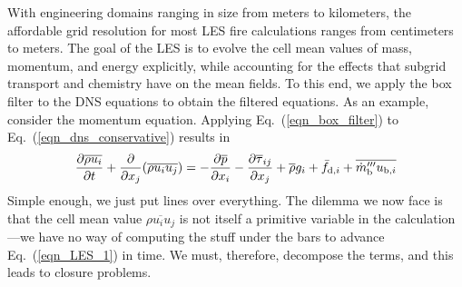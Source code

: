 With engineering domains ranging in size from meters to kilometers, the affordable grid resolution for most LES fire calculations ranges from centimeters to meters.  The goal of the LES is to evolve the cell mean values of mass, momentum, and energy explicitly, while accounting for the effects that subgrid transport and chemistry have on the mean fields.  To this end, we apply the box filter to the DNS equations to obtain the filtered equations.  As an example, consider the momentum equation.  Applying Eq.~(\ref{eqn_box_filter}) to Eq.~(\ref{eqn_dns_conservative}) results in
\begin{equation}
\label{eqn_LES_1}
\frac{\partial \overline{\rho u_i}}{\partial t} + \frac{\partial}{\partial x_j} (\overline{\rho u_i u_j}) = -\frac{\partial \overline{p}}{\partial x_i} - \frac{\partial \overline{\tau}_{ij}}{\partial x_j} + \overline{\rho} g_i + \bar{f}_{{\rm d},i} + \overline{\dot{m}_{\rm b}^{\prime\prime\prime} u_{{\rm b},i}}
\end{equation}
Simple enough, we just put lines over everything.  The dilemma we now face is that the cell mean value $\overline{\rho u_i u_j}$ is not itself a primitive variable in the calculation---we have no way of computing the stuff under the bars to advance Eq.~(\ref{eqn_LES_1}) in time.  We must, therefore, decompose the terms, and this leads to closure problems.

